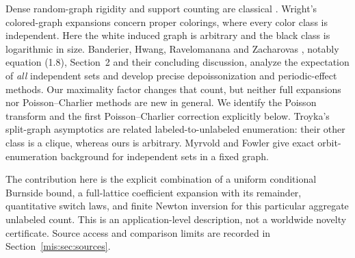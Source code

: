 \documentclass[11pt]{article}
\theoremstyle{remark}\newtheorem{remark}[theorem]{Remark}
\begin{document}
Dense random-graph rigidity and support counting are classical \cite{er}. Wright's colored-graph expansions \cite{wright} concern proper colorings, where every color class is independent. Here the white induced graph is arbitrary and the black class is logarithmic in size. Banderier, Hwang, Ravelomanana and Zacharovas \cite{bhvr}, notably equation (1.8), Section~2 and their concluding discussion, analyze the expectation of \emph{all} independent sets and develop precise depoissonization and periodic-effect methods. Our maximality factor changes that count, but neither full expansions nor Poisson--Charlier methods are new in general. We identify the Poisson transform and the first Poisson--Charlier correction explicitly below. Troyka's split-graph asymptotics \cite{troyka} are related labeled-to-unlabeled enumeration: their other class is a clique, whereas ours is arbitrary. Myrvold and Fowler \cite{mf} give exact orbit-enumeration background for independent sets in a fixed graph.

The contribution here is the explicit combination of a uniform conditional Burnside bound, a full-lattice coefficient expansion with its remainder, quantitative switch laws, and finite Newton inversion for this particular aggregate unlabeled count. This is an application-level description, not a worldwide novelty certificate. Source access and comparison limits are recorded in Section~\ref{mis:sec:sources}.
\end{document}
